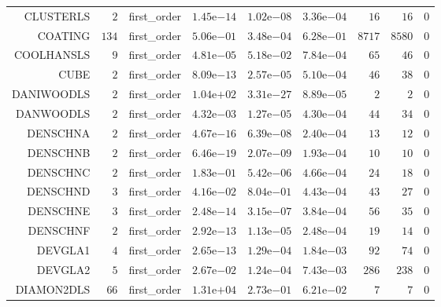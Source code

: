 \begin{longtable}{rrrrrrrrr}
CLUSTERLS & \(     2\) & first\_order & \( 1.45\)e\(-14\) & \( 1.02\)e\(-08\) & \( 3.36\)e\(-04\) & \(    16\) & \(    16\) & \(     0\) \\
COATING & \(   134\) & first\_order & \( 5.06\)e\(-01\) & \( 3.48\)e\(-04\) & \( 6.28\)e\(-01\) & \(  8717\) & \(  8580\) & \(     0\) \\
COOLHANSLS & \(     9\) & first\_order & \( 4.81\)e\(-05\) & \( 5.18\)e\(-02\) & \( 7.84\)e\(-04\) & \(    65\) & \(    46\) & \(     0\) \\
CUBE & \(     2\) & first\_order & \( 8.09\)e\(-13\) & \( 2.57\)e\(-05\) & \( 5.10\)e\(-04\) & \(    46\) & \(    38\) & \(     0\) \\
DANIWOODLS & \(     2\) & first\_order & \( 1.04\)e\(+02\) & \( 3.31\)e\(-27\) & \( 8.89\)e\(-05\) & \(     2\) & \(     2\) & \(     0\) \\
DANWOODLS & \(     2\) & first\_order & \( 4.32\)e\(-03\) & \( 1.27\)e\(-05\) & \( 4.30\)e\(-04\) & \(    44\) & \(    34\) & \(     0\) \\
DENSCHNA & \(     2\) & first\_order & \( 4.67\)e\(-16\) & \( 6.39\)e\(-08\) & \( 2.40\)e\(-04\) & \(    13\) & \(    12\) & \(     0\) \\
DENSCHNB & \(     2\) & first\_order & \( 6.46\)e\(-19\) & \( 2.07\)e\(-09\) & \( 1.93\)e\(-04\) & \(    10\) & \(    10\) & \(     0\) \\
DENSCHNC & \(     2\) & first\_order & \( 1.83\)e\(-01\) & \( 5.42\)e\(-06\) & \( 4.66\)e\(-04\) & \(    24\) & \(    18\) & \(     0\) \\
DENSCHND & \(     3\) & first\_order & \( 4.16\)e\(-02\) & \( 8.04\)e\(-01\) & \( 4.43\)e\(-04\) & \(    43\) & \(    27\) & \(     0\) \\
DENSCHNE & \(     3\) & first\_order & \( 2.48\)e\(-14\) & \( 3.15\)e\(-07\) & \( 3.84\)e\(-04\) & \(    56\) & \(    35\) & \(     0\) \\
DENSCHNF & \(     2\) & first\_order & \( 2.92\)e\(-13\) & \( 1.13\)e\(-05\) & \( 2.48\)e\(-04\) & \(    19\) & \(    14\) & \(     0\) \\
DEVGLA1 & \(     4\) & first\_order & \( 2.65\)e\(-13\) & \( 1.29\)e\(-04\) & \( 1.84\)e\(-03\) & \(    92\) & \(    74\) & \(     0\) \\
DEVGLA2 & \(     5\) & first\_order & \( 2.67\)e\(-02\) & \( 1.24\)e\(-04\) & \( 7.43\)e\(-03\) & \(   286\) & \(   238\) & \(     0\) \\
DIAMON2DLS & \(    66\) & first\_order & \( 1.31\)e\(+04\) & \( 2.73\)e\(-01\) & \( 6.21\)e\(-02\) & \(     7\) & \(     7\) & \(     0\) \\

\end{longtable}
